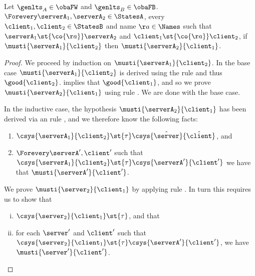 \noindent%
\textbf{}
  Let $\genlts_A \in \obaFW$ and
  $\genlts_B \in \obaFB$.
  $\Forevery \serverA_1, \serverA_2 \in \StatesA$,
  every $\client_1, \client_2 \in \StatesB$ and name $\aa \in \Names$ such that
  $\serverA_1 \st{\co{\aa}} \serverA_2$ and
  $\client_1 \st{\co{\aa}} \client_2$,
  if $\musti{\serverA_1}{\client_2}$ then $\musti{\serverA_2}{\client_1}$.
\begin{proof}
  We proceed by induction on $\musti{\serverA_1}{\client_2}$.
  In the base case  $\musti{\serverA_1}{\client_2}$ is derived using the rule \mnow
  and thus $\good{\client_2}$.
   implies that $\good{\client_1}$,
  and so we prove $\musti{\serverA_2}{\client_1}$ using rule \mnow.
  We are done with the base case.

  
  In the inductive case, the hypothesis $\musti{\serverA_2}{\client_1}$ has been derived
  via an rule \mstep, and we therefore know the following facts:
  \begin{enumerate}
  \item
    \label{must-output-swap-l-fw-h-2-1}
    \label{pt:output-swap-inductive-case-fact-1}
    $\csys{\serverA_1}{\client_2} \st{\tau} \csys{\hat{\server}}{\hat{\client}} $, and
  \item
    \label{pt:output-swap-inductive-case-fact-2}
    $\Forevery \serverA', \client'$ such that
    $\csys{\serverA_1}{\client_2}\st{\tau}\csys{\serverA'}{\client'}$ we have that
    $\musti{\serverA'}{\client'}$.
  \end{enumerate}

  
  We prove $\musti{\server_2}{\client_1}$ by applying rule \mstep. In turn this requires us to show that \begin{enumerate}[(i)]
  \item
    \label{must-output-swap-l-fw-g-1}
    $\csys{\server_2}{\client_1} \st{\tau}$, and that
  \item
    \label{must-output-swap-l-fw-g-2}
    for each $\server'$ and $\client'$ such that
    $\csys{\server_2}{\client_1} \st{\tau} \csys{\serverA'}{\client'}$,
    we have $\musti{\server'}{\client'}$.
  \end{enumerate}



\end{proof}
